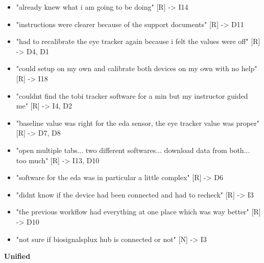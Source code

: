 \documentclass[
]{article}
\begin{document}
\begin{itemize}
\item
  "already knew what i am going to be doing" {[}R{]} -\textgreater{} I14
\item
  "instructions were clearer because of the support documents" {[}R{]} -\textgreater{} D11
\item
  "had to recalibrate the eye tracker again because i felt the values were off" {[}R{]} -\textgreater{} D4, D1
\item
  "could setup on my own and calibrate both devices on my own with no help" {[}R{]} -\textgreater{} I18
\item
  "couldnt find the tobi tracker software for a min but my instructor guided me" {[}R{]} -\textgreater{} I4, D2
\item
  "baseline value was right for the eda sensor, the eye tracker value was proper" {[}R{]} -\textgreater{} D7, D8
\item
  "open multiple tabs... two different softwares... download data from both... too much" {[}R{]} -\textgreater{} I13, D10
\item
  "software for the eda was in particular a little complex" {[}R{]} -\textgreater{} D6
\item
  "didnt know if the device had been connected and had to recheck" {[}R{]} -\textgreater{} I3
\item
  "the previous workflow had everything at one place which was way better" {[}R{]} -\textgreater{} D10
\item
  "not sure if biosignalsplux hub is connected or not" {[}N{]} -\textgreater{} I3
\end{itemize}

\textbf{Unified}
\end{document}
